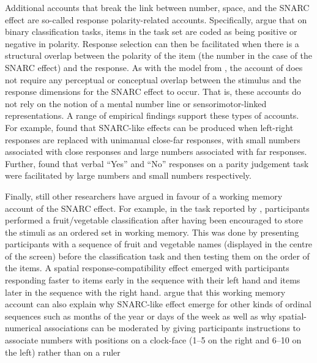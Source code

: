 \documentclass[A4paper,man,floatsintext]{apa6}
\theoremstyle{definition}
\theoremstyle{definition}
\theoremstyle{definition}
\theoremstyle{remark}
\begin{document}
Additional accounts that break the link between number, space, and the
SNARC effect are so-called response polarity-related accounts.
Specifically, \textcite{Proctor:2006jv} argue that on binary
classification tasks, items in the task set are coded as being positive
or negative in polarity. Response selection can then be facilitated when
there is a structural overlap between the polarity of the item (the
number in the case of the SNARC effect) and the response. As with the
model from \textcite{Gevers:2006model}, the account of
\textcite{Proctor:2006jv} does not require any perceptual or conceptual
overlap between the stimulus and the response dimensions for the SNARC
effect to occur. That is, these accounts do not rely on the notion of a
mental number line or sensorimotor-linked representations. A range of
empirical findings support these types of accounts. For example,
\textcite{Santens:2008} found that SNARC-like effects can be produced
when left-right responses are replaced with unimanual close-far
responses, with small numbers associated with close responses and large
numbers associated with far responses. Further, \textcite{Landy:2008}
found that verbal \enquote{Yes} and \enquote{No} responses on a parity
judgement task were facilitated by large numbers and small numbers
respectively.

Finally, still other researchers have argued in favour of a working
memory account of the SNARC effect. For example, in the task reported by
\textcite{vanDijck:2011kk}, participants performed a fruit/vegetable
classification after having been encouraged to store the stimuli as an
ordered set in working memory. This was done by presenting participants
with a sequence of fruit and vegetable names (displayed in the centre of
the screen) before the classification task and then testing them on the
order of the items. A spatial response-compatibility effect emerged with
participants responding faster to items early in the sequence with their
left hand and items later in the sequence with the right hand.
\textcite{vanDijck:2011kk} argue that this working memory account can
also explain why SNARC-like effect emerge for other kinds of ordinal
sequences such as months of the year \autocite{Gevers:2003je} or days of
the week \autocite{Gevers:2004gj} as well as why spatial-numerical
associations can be moderated by giving participants instructions to
associate numbers with positions on a clock-face (1--5 on the right and
6--10 on the left) rather than on a ruler \autocite[1--5 on the left and
6--10 on the right;][]{Bachtold:1998}
\end{document}
